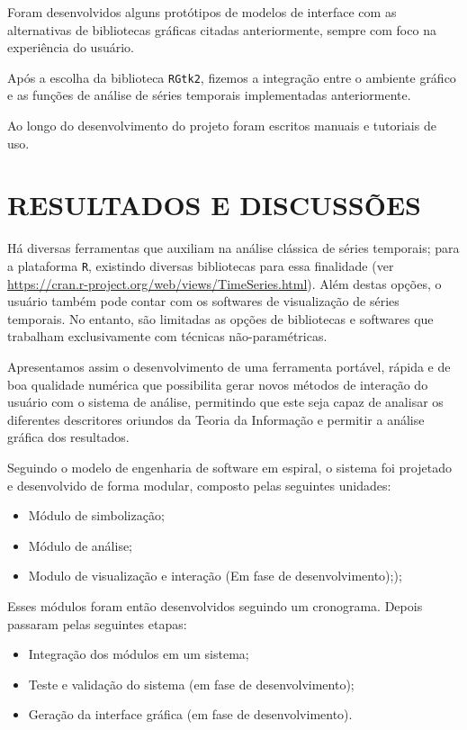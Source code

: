 \documentclass[12pt,letterpaper]{article}
\begin{document}
Foram desenvolvidos alguns protótipos de modelos de interface com as alternativas de bibliotecas gráficas citadas anteriormente, sempre com foco na experiência do usuário.

Após a escolha da biblioteca \texttt{RGtk2}, fizemos a integração entre o ambiente gráfico e as funções de análise de séries temporais implementadas anteriormente.

Ao longo do desenvolvimento do projeto foram escritos manuais e tutoriais de uso.


\newpage
\section*{\centering \textbf{RESULTADOS E DISCUSSÕES}} %

Há diversas ferramentas que auxiliam na análise clássica de séries temporais; para a plataforma \texttt R, existindo diversas bibliotecas para essa finalidade (ver \url{https://cran.r-project.org/web/views/TimeSeries.html}). 
Além destas opções, o usuário também pode contar com os softwares de visualização de séries temporais. 
No entanto, são limitadas as opções de bibliotecas e softwares que trabalham exclusivamente com técnicas não-paramétricas.

Apresentamos assim o desenvolvimento de uma ferramenta portável, rápida e de boa qualidade numérica que possibilita gerar novos métodos de interação do usuário com o sistema de análise, permitindo que este seja capaz de analisar os diferentes descritores oriundos da Teoria da Informação e permitir a análise gráfica dos resultados.

Seguindo o modelo de engenharia de software em espiral, o sistema foi projetado e desenvolvido de forma modular, composto pelas seguintes unidades:

\begin{itemize}
\item Módulo de simbolização;
\item Módulo de análise;
\item Modulo de visualização e interação (Em fase de desenvolvimento););
\end{itemize} 

Esses módulos foram então desenvolvidos seguindo um cronograma. 
Depois passaram pelas seguintes etapas:

\begin{itemize}
\item Integração dos módulos em um sistema;
\item Teste e validação do sistema (em fase de desenvolvimento);
\item Geração da interface gráfica (em fase de desenvolvimento).
\end{itemize}
\end{document}
